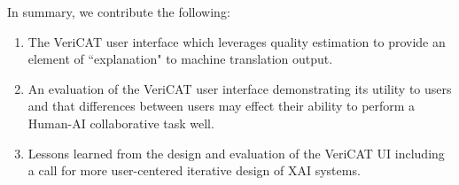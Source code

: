 In summary, we contribute the following: 
\begin{enumerate}
    \item The VeriCAT user interface which leverages quality estimation to provide an element of ``explanation" to machine translation output. 
    \item An evaluation of the VeriCAT user interface demonstrating its utility to users and that differences between users may effect their ability to perform a Human-AI collaborative task well.
    \item Lessons learned from the design and evaluation of the VeriCAT UI including a call for more user-centered iterative design of XAI systems. 
\end{enumerate}
